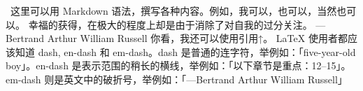\markdownRendererInterblockSeparator
{}\LaTex\ 这里可以用 Markdown 语法，撰写各种内容。例如，我可以，也可以，当然也可以。\markdownRendererInterblockSeparator
{}\markdownRendererInterblockSeparator
{}\markdownRendererBlockQuoteBegin
幸福的获得，在极大的程度上却是由于消除了对自我的过分关注。 ---Bertrand Arthur William Russell
\markdownRendererBlockQuoteEnd \markdownRendererInterblockSeparator
{}你看，我还可以使用引用↑。\markdownRendererInterblockSeparator
{}\markdownRendererInterblockSeparator
{}LaTeX 使用者都应该知道 dash, en-dash 和 em-dash。dash 是普通的连字符，举例如：「five-year-old boy」。en-dash 是表示范围的稍长的横线，举例如：「以下章节是重点：12--15」。em-dash 则是英文中的破折号，举例如：「---Bertrand Arthur William Russell」\relax